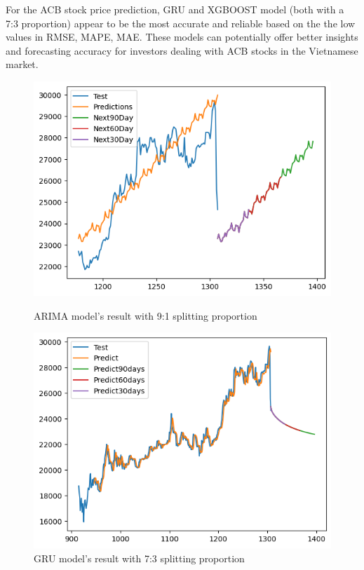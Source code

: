 \documentclass{ieeeojies}
\begin{document}
For the ACB stock price prediction, GRU and XGBOOST model (both with a 7:3 proportion) appear to be the most accurate and reliable based on the the low
values in RMSE, MAPE, MAE. These models can potentially offer better insights and forecasting accuracy for investors dealing with ACB stocks in the Vietnamese market.
\begin{figure}[H]
    \centering
    \begin{minipage}{0.43\linewidth}
        \centering
        \includegraphics[width=\linewidth]{bibliography/diagram/ARIMA-ACB.png}
        \caption{ARIMA model’s result with 9:1 splitting proportion}
        \label{fig:ARIMA}
    \end{minipage}
    \hfill
    \begin{minipage}{0.43\linewidth}
        \centering
        \includegraphics[width=\linewidth]{bibliography/diagram/GRU-ACB.png}
        \caption{GRU model’s result with 7:3 splitting proportion}
        \label{fig:GRU}
    \end{minipage}
\end{figure}
\end{document}
